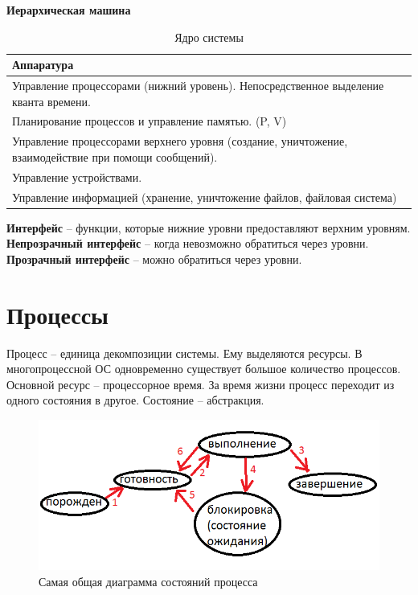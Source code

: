 \textbf{Иерархическая машина} \cite{IBM360}

\begin{table}[H]
\caption{Ядро системы}
\begin{tabular}{|l|}
\hline
Аппаратура\\
\hline
Управление процессорами (нижний уровень). Непосредственное выделение кванта времени.\\
\hline
Планирование процессов и управление памятью. (P, V)\\
\hline
Управление процессорами верхнего уровня (создание, уничтожение, взаимодействие при помощи сообщений).\\
\hline
Управление устройствами.\\
\hline
Управление информацией (хранение, уничтожение файлов, файловая система)\\
\hline
\end{tabular}
\end{table}

\textbf{Интерфейс} – функции, которые нижние уровни предоставляют верхним уровням.
\textbf{Непрозрачный интерфейс} – когда невозможно обратиться через уровни.
\textbf{Прозрачный интерфейс} – можно обратиться через уровни.

\chapter{Процессы}

Процесс – единица декомпозиции системы. Ему выделяются ресурсы. В многопроцессной ОС одновременно существует большое количество процессов. Основной ресурс – процессорное время. За время жизни процесс переходит из одного состояния в другое. Состояние – абстракция.

\begin{figure}[H]
  \centering
  \includegraphics[width=\textwidth]{pic/2.png}
  \caption{Самая общая диаграмма состояний процесса}
  \label{pic:diag_proc}
\end{figure}

